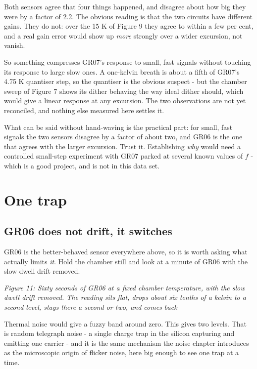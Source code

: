 Both sensors agree that four things happened, and disagree about how big
they were by a factor of 2.2. The obvious reading is that the two
circuits have different gains. They do not: over the 15 K of Figure 9
they agree to within a few per cent, and a real gain error would show up
\emph{more} strongly over a wider excursion, not vanish.

So something compresses GR07's response to small, fast signals without
touching its response to large slow ones. A one-kelvin breath is about a
fifth of GR07's 4.75 K quantiser step, so the quantiser is the obvious
suspect - but the chamber sweep of Figure 7 shows its dither behaving
the way ideal dither should, which would give a linear response at any
excursion. The two observations are not yet reconciled, and nothing else
measured here settles it.

What can be said without hand-waving is the practical part: for small,
fast signals the two sensors disagree by a factor of about two, and GR06
is the one that agrees with the larger excursion. Trust it. Establishing
\emph{why} would need a controlled small-step experiment with GR07
parked at several known values of \(f\) - which is a good project, and
is not in this data set.

\section{One trap}\label{one-trap}

\subsection{GR06 does not drift, it
switches}\label{gr06-does-not-drift-it-switches}

GR06 is the better-behaved sensor everywhere above, so it is worth
asking what actually limits \emph{it}. Hold the chamber still and look
at a minute of GR06 with the slow dwell drift removed.


{
\centering
{}
}

\emph{Figure 11: Sixty seconds of GR06 at a fixed chamber temperature,
with the slow dwell drift removed. The reading sits flat, drops about
six tenths of a kelvin to a second level, stays there a second or two,
and comes back}

Thermal noise would give a fuzzy band around zero. This gives two
levels. That is random telegraph noise - a single charge trap in the
silicon capturing and emitting one carrier - and it is the same
mechanism the noise chapter introduces as the microscopic origin of
flicker noise, here big enough to see one trap at a time.

